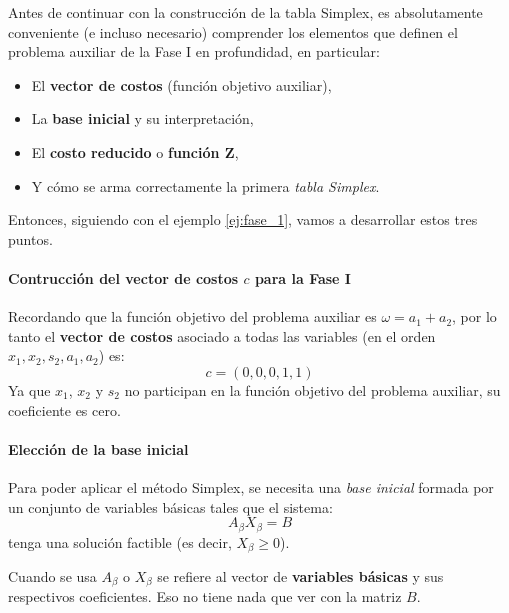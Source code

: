 Antes de continuar con la construcción de la tabla Simplex, es absolutamente conveniente (e incluso necesario) comprender los elementos que definen el problema auxiliar de la Fase I en profundidad, en particular:
\begin{itemize}
  \item El \textbf{vector de costos} (función objetivo auxiliar),
  \item La \textbf{base inicial} y su interpretación,
  \item El \textbf{costo reducido} o \textbf{función Z},
  \item Y cómo se arma correctamente la primera \textit{tabla Simplex}.
\end{itemize}

Entonces, siguiendo con el ejemplo \ref{ej:fase_1}, vamos a desarrollar estos tres puntos.

\paragraph{Contrucción del vector de costos \(c\) para la Fase I}

Recordando que la función objetivo del problema auxiliar es \(\omega = a_1 + a_2\), por lo tanto el \textbf{vector de costos} asociado a todas las variables (en el orden \(x_1, x_2, s_2, a_1, a_2\)) es: 
\[c = (0, 0, 0, 1, 1)\]
Ya que \(x_1\), \(x_2\) y \(s_2\) no participan en la función objetivo del problema auxiliar, su coeficiente es cero.

\paragraph{Elección de la base inicial}

Para poder aplicar el método Simplex, se necesita una \textit{base inicial} formada por un conjunto de variables básicas tales que el sistema:
\[
A_{\beta}X_{\beta} = B
\]
tenga una solución factible (es decir, \(X_\beta \geq 0\)).
\begin{tcolorbox}[remember, title=Aclaración]
  Cuando se usa \(A_\beta\) o \(X_\beta\) se refiere al vector de \textbf{variables básicas} y sus respectivos coeficientes. Eso no tiene nada que ver con la matriz \(B\).
\end{tcolorbox}

